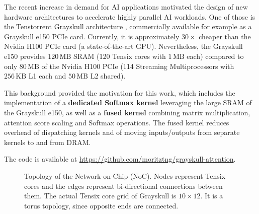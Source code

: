 \documentclass[conference]{IEEEtran}
\begin{document}
The recent increase in demand for AI applications motivated the design of new hardware architectures to accelerate highly parallel AI workloads. One of those is the Tenstorrent Grayskull architecture \cite{vasiljevic2021, tenstorrent-cards, grayskull-architecture, grayskull-noc}, commercially available for example as a Grayskull e150 PCIe card. Currently, it is approximately \(30\times\) cheaper than the Nvidia H100 PCIe card \cite{nvidia2022} (a state-of-the-art GPU). Nevertheless, the Grayskull e150 provides \(120\,\text{MB}\) SRAM (120 Tensix cores with \(1\,\text{MB}\) each) compared to only \(80\,\text{MB}\) of the Nvidia H100 PCIe (114 Streaming Multiprocessors with \(256\,\text{KB}\) L1 each and \(50\,\text{MB}\) L2 shared). 

This background provided the motivation for this work, which includes the implementation of a \textbf{dedicated Softmax kernel} leveraging the large SRAM of the Grayskull e150, as well as a \textbf{fused kernel} combining matrix multiplication, attention score scaling and Softmax operations. The fused kernel reduces overhead of dispatching kernels and of moving inputs/outputs from separate kernels to and from DRAM.

The code is available at \url{https://github.com/moritztng/grayskull-attention}.

\begin{figure}[h]
\centering
{}
\caption{Topology of the Network-on-Chip (NoC). Nodes represent Tensix cores and the edges represent bi-directional connections between them. The actual Tensix core grid of Grayskull is \(10 \times 12\). It is a torus topology, since opposite ends are connected.}
\label{fig:noc_topology}
\end{figure}
\end{document}
